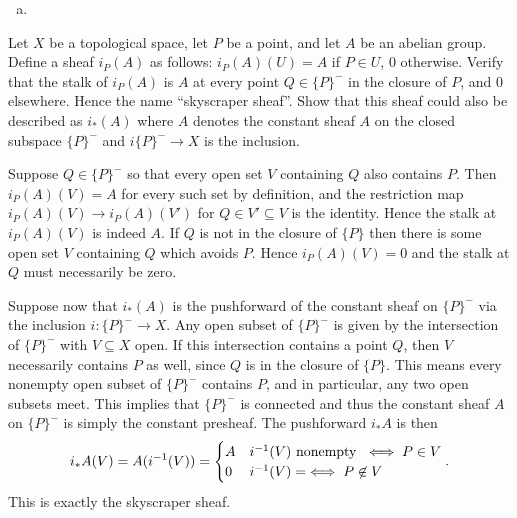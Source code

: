 \begin{homework}[e]
\begin{prf}
\begin{enumerate}[(a)]
			\item 
		\end{enumerate}
	\end{prf}
	 Let $X$ be a topological space, let $P$ be a point, and let $A$ be an abelian group. Define a sheaf $i_P(A)$ as follows: $i_P(A)(U) = A$ if $P\in U$, $0$ otherwise. Verify that the stalk of $i_P(A)$ is $A$ at every point $Q\in \{P\}^-$ in the closure of $P$, and $0$ elsewhere. Hence the name ``skyscraper sheaf''. Show that this sheaf could also be described as $i_*(A)$ where $A$ denotes the constant sheaf $A$ on the closed subspace $\{P\}^-$ and $i\{P\}^-\to X$ is the inclusion.
	\begin{prf}
		Suppose $Q\in \{P\}^-$ so that every open set $V$ containing $Q$ also contains $P$. Then $i_P(A)(V) = A$ for every such set by definition, and the restriction map $i_P(A)(V) \to i_P(A)(V')$ for $Q \in V' \subseteq V$ is the identity. Hence the stalk at $i_P(A)(V)$ is indeed $A$. If $Q$ is not in the closure of $\{P\}$ then there is some open set $V$ containing $Q$ which avoids $P$. Hence $i_P(A)(V) = 0$ and the stalk at $Q$ must necessarily be zero.

		Suppose now that $i_*(A)$ is the pushforward of the constant sheaf on $\{P\}^-$ via the inclusion $i:\{P\}^-\to X$. Any open subset of $\{P\}^-$ is given by the intersection of $\{P\}^-$ with $V\subseteq X$ open. If this intersection contains a point $Q$, then $V$ necessarily contains $P$ as well, since $Q$ is in the closure of $\{P\}$. This means every nonempty open subset of $\{P\}^-$ contains $P$, and in particular, any two open subsets meet. This implies that $\{P\}^-$ is connected and thus the constant sheaf $A$ on $\{P\}^-$ is simply the constant presheaf. The pushforward $i_*A$ is then
		\begin{align*}
			i_*A(V) = A(i^{-1}(V)) =
			\begin{cases}
				A & i^{-1}(V) \text{ nonempty } \iff P\in V\\
				0 & i^{-1}(V) = \empty \iff P\not\in V
			\end{cases}.
		\end{align*}
		This is exactly the skyscraper sheaf.
	\end{prf}
\end{homework}

